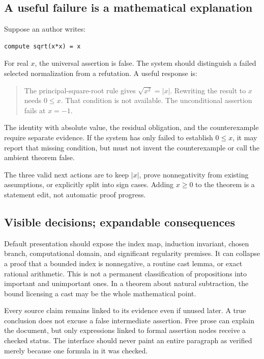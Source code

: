 \documentclass[11pt,a4paper]{article}
\theoremstyle{definition}
\begin{document}
\subsection{A useful failure is a mathematical explanation}
Suppose an author writes:
\par\noindent\begin{minipage}{\linewidth}
\begin{lstlisting}
compute sqrt(x*x) = x
\end{lstlisting}
\end{minipage}\par
For real \(x\), the universal assertion is false. The system should distinguish a failed selected normalization from a refutation. A useful response is:
\begin{quote}
The principal-square-root rule gives \(\sqrt{x^2}=|x|\). Rewriting the result to \(x\) needs \(0\leq x\). That condition is not available. The unconditional assertion fails at \(x=-1\).
\end{quote}
The identity with absolute value, the residual obligation, and the counterexample require separate evidence. If the system has only failed to establish \(0\le x\), it may report that missing condition, but must not invent the counterexample or call the ambient theorem false.

The three valid next actions are to keep \(|x|\), prove nonnegativity from existing assumptions, or explicitly split into sign cases. Adding \(x\ge0\) to the theorem is a statement edit, not automatic proof progress.

\subsection{Visible decisions; expandable consequences}
Default presentation should expose the index map, induction invariant, chosen branch, computational domain, and significant regularity premises. It can collapse a proof that a bounded index is nonnegative, a routine cast lemma, or exact rational arithmetic. This is not a permanent classification of propositions into important and unimportant ones. In a theorem about natural subtraction, the bound licensing a cast may be the whole mathematical point.

Every source claim remains linked to its evidence even if unused later. A true conclusion does not excuse a false intermediate assertion. Free prose can explain the document, but only expressions linked to formal assertion nodes receive a checked status. The interface should never paint an entire paragraph as verified merely because one formula in it was checked.
\end{document}
